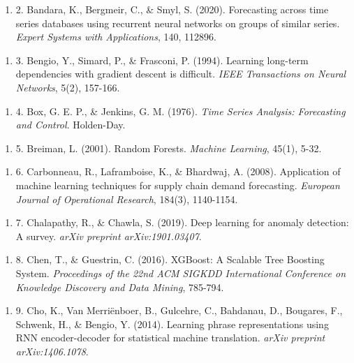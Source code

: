 \documentclass[12pt, a4paper]{report}
\begin{document}
\begin{enumerate}
\item 2. Bandara, K., Bergmeir, C., \& Smyl, S. (2020). Forecasting across time series databases using recurrent neural networks on groups of similar series. \textit{Expert Systems with Applications}, 140, 112896.
\end{enumerate}

\begin{enumerate}
\item 3. Bengio, Y., Simard, P., \& Frasconi, P. (1994). Learning long-term dependencies with gradient descent is difficult. \textit{IEEE Transactions on Neural Networks}, 5(2), 157-166.
\end{enumerate}

\begin{enumerate}
\item 4. Box, G. E. P., \& Jenkins, G. M. (1976). \textit{Time Series Analysis: Forecasting and Control}. Holden-Day.
\end{enumerate}

\begin{enumerate}
\item 5. Breiman, L. (2001). Random Forests. \textit{Machine Learning}, 45(1), 5-32.
\end{enumerate}

\begin{enumerate}
\item 6. Carbonneau, R., Laframboise, K., \& Bhardwaj, A. (2008). Application of machine learning techniques for supply chain demand forecasting. \textit{European Journal of Operational Research}, 184(3), 1140-1154.
\end{enumerate}

\begin{enumerate}
\item 7. Chalapathy, R., \& Chawla, S. (2019). Deep learning for anomaly detection: A survey. \textit{arXiv preprint arXiv:1901.03407}.
\end{enumerate}

\begin{enumerate}
\item 8. Chen, T., \& Guestrin, C. (2016). XGBoost: A Scalable Tree Boosting System. \textit{Proceedings of the 22nd ACM SIGKDD International Conference on Knowledge Discovery and Data Mining}, 785-794.
\end{enumerate}

\begin{enumerate}
\item 9. Cho, K., Van Merriënboer, B., Gulcehre, C., Bahdanau, D., Bougares, F., Schwenk, H., \& Bengio, Y. (2014). Learning phrase representations using RNN encoder-decoder for statistical machine translation. \textit{arXiv preprint arXiv:1406.1078}.
\end{enumerate}
\end{document}
